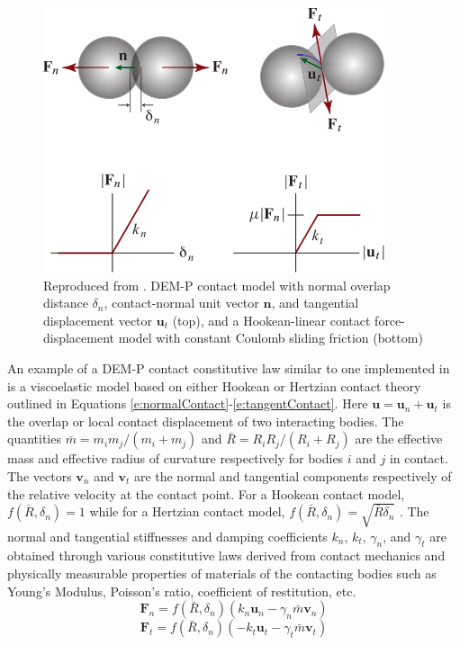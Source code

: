 \documentclass[12pt,onecolumn]{report}
\newcommand{\CHRONO}{{\sffamily{{Chrono}}}}
\begin{document}
\begin{figure}
	\centering
	\includegraphics[width=0.8\columnwidth]{Figs/DEM-PM_Contact_Model.png}
	\caption{\small Reproduced from \protect\cite{Chrono2016}. DEM-P contact model with normal overlap distance $\delta_n$, contact-normal unit vector $\boldsymbol{n}$, and tangential displacement vector $\boldsymbol{u}_t$ (top), and a Hookean-linear contact force-displacement model with constant Coulomb sliding friction (bottom) }  
	\label{fig:Penalty}
\end{figure}

An example of a DEM-P contact constitutive law similar to one implemented in {\CHRONO} is a viscoelastic model based on either Hookean or Hertzian contact theory outlined in Equations \ref{e:normalContact}-\ref{e:tangentContact}. Here $\boldsymbol{u} = \boldsymbol{u}_n + \boldsymbol{u}_t$ is the overlap or local contact displacement of two interacting bodies. The quantities $\bar{m} = m_i m_j/\left(m_i + m_j\right)$ and $\bar{R} = R_i R_j/\left(R_i + R_j\right)$ are the effective mass and effective radius of curvature respectively for bodies $i$ and $j$ in contact. The vectors $\boldsymbol{v}_n$ and $\boldsymbol{v}_t$ are the normal and tangential components respectively of the relative velocity at the contact point. For a Hookean contact model, $f\left(\bar{R},\delta_n\right) = 1$ while for a Hertzian contact model, $f\left(\bar{R},\delta_n\right) = \sqrt{\bar{R}\delta_n}$ \cite{silbert2001granular,zhang2005jamming,MachadoMoreiraFloresLankarani2012}. The normal and tangential stiffnesses and damping coefficients $k_n$, $k_t$, $\gamma_n$, and $\gamma_t$ are obtained through various constitutive laws derived from contact mechanics and physically measurable properties of materials of the contacting bodies such as Young's Modulus, Poisson's ratio, coefficient of restitution, etc. 
%
\begin{equation}\label{e:normalContact}
\boldsymbol{F}_n = f\left(\bar{R},\delta_n\right)\left(k_n \boldsymbol{u}_n - \gamma_n \bar{m}\boldsymbol{v}_n\right)
\end{equation}
%
\begin{equation}\label{e:tangentContact}
\boldsymbol{F}_t = f\left(\bar{R},\delta_n\right)\left(-k_t \boldsymbol{u}_t - \gamma_t \bar{m}\boldsymbol{v}_t\right)
\end{equation}
\end{document}
